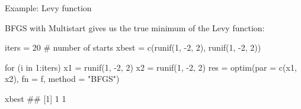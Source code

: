 \documentclass[11pt,compress,t,notes=noshow, xcolor=table]{beamer}
\begin{document}
\begin{vbframe}{Example: Levy function}
\framebreak

BFGS with Multistart gives us the true minimum of the Levy function:\\
\lz

\footnotesize
\begin{verbbox}
iters = 20 # number of starts
xbest = c(runif(1, -2, 2), runif(1, -2, 2))
\end{verbbox}
\theverbbox


\vspace{0.4cm}
\begin{verbbox}
for (i in 1:iters) {
x1 = runif(1, -2, 2)
x2 = runif(1, -2, 2)
res = optim(par = c(x1, x2), fn = f, method = "BFGS")
}
\end{verbbox}
\theverbbox

\vspace{0.4cm}
\theverbbox

\vspace{0.4cm}
\begin{verbbox}
xbest
## [1] 1 1
\end{verbbox}
\theverbbox





\end{vbframe}



\endlecture
\end{document}

